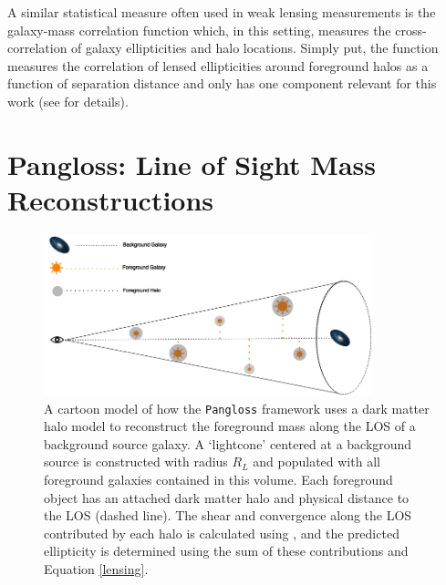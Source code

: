 \documentclass[%
 reprint,
 amsmath,amssymb,
 aps,nofootinbib
]{revtex4-1}
\begin{document}
A similar statistical measure often used in weak lensing measurements is the galaxy-mass correlation function which, in this setting, measures the cross-correlation of galaxy ellipticities and halo locations. Simply put, the function measures the correlation of lensed ellipticities around foreground halos as a function of separation distance and only has one component relevant for this work (see \cite{gm_corr} for details).


\section{Pangloss: Line of Sight Mass Reconstructions} \label{pangloss}

\begin{figure}
    \centering
    \includegraphics[width=0.85\textwidth]{figs-swe/thesis/pangloss_cartoon.png}
    \captionsetup{justification=raggedright,singlelinecheck=false}
    \caption{A cartoon model of how the \texttt{Pangloss} framework uses a dark matter halo model to reconstruct the foreground mass along the LOS of a background source galaxy. A `lightcone' centered at a background source is constructed with radius $R_L$ and populated with all foreground galaxies contained in this volume. Each foreground object has an attached dark matter halo and physical distance to the LOS (dashed line). The shear and convergence along the LOS contributed by each halo is calculated using \cite{lensing_calc}, and the predicted ellipticity is determined using the sum of these contributions and Equation \eqref{lensing}.}
    \label{pangloss_cartoon}
\end{figure}
\end{document}
